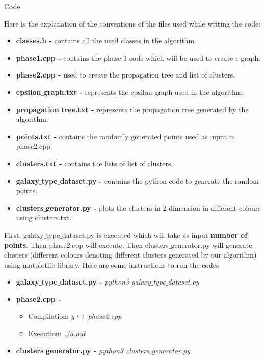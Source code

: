 \documentclass[acmsmall]{acmart}
\begin{document}
\textcolor{blue}{\href{https://drive.google.com/drive/folders/1wbLkR-BecbqGR8qKKggDeKDug44drfDI?usp=sharing}{Code}} 

Here is the explanation of the conventions of the files used while writing the code:
\begin{itemize}
    \item \textbf{classes.h - } contains all the used classes in the algorithm.
    \item \textbf{phase1.cpp - } contains the phase-1 code which will be used to create $\epsilon$-graph.
    \item \textbf{phase2.cpp - } used to create the propagation tree and list of clusters.
    \item \textbf{epsilon$\_$graph.txt - } represents the epsilon graph used in the algorithm.
    \item \textbf{propagation$\_$tree.txt - } represents the propagation tree generated by the algorithm.
    \item \textbf{points.txt - } contains the randomly generated points used as input in phase2.cpp.
    \item \textbf{clusters.txt - } contains the lists of list of clusters.
    \item \textbf{galaxy$\_$type$\_$dataset.py - } contains the python code to generate the random points.
    \item \textbf{clusters$\_$generator.py - } plots the clusters in 2-dimension in different colours using clusters.txt.
\end{itemize}
First, galaxy$\_$type$\_$dataset.py is executed which will take as input \textbf{number of points}. Then phase2.cpp will execute. Then clusters$\_$generator.py will generate clusters (different colours denoting different clusters generated by our algorithm) using matplotlib library. \newline
Here are some instructions to run the codes:
\begin{itemize}
    \item \textbf{galaxy$\_$type$\_$dataset.py - } \textit{python3 galaxy$\_$type$\_$dataset.py}
    \item \textbf{phase2.cpp - }
        \begin{itemize}
            \item Compilation:  \textit{g++ phase2.cpp}
            \item Execution:  \textit{./a.out}
        \end{itemize}
    \item \textbf{clusters$\_$generator.py - } \textit{python3 clusters$\_$generator.py}
\end{itemize}
\end{document}
